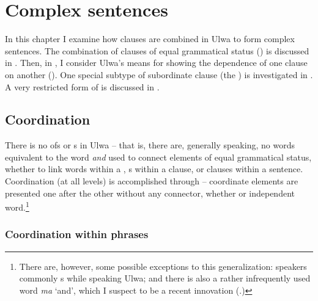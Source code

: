 \chapter{Complex sentences}\label{sec:12}


In this chapter I examine how clauses are combined in Ulwa to form complex sentences. The combination of clauses of equal grammatical status () is discussed in . Then, in , I consider Ulwa’s means for showing the dependence of one clause on another (). One special subtype of subordinate clause (the ) is investigated in . A very restricted form of  is discussed in .


\section{Coordination}\label{sec:12.1}


There is no  ofs or s in Ulwa -- that is, there are, generally speaking, no words equivalent to the  word \textit{and} used to connect elements of equal grammatical status, whether to link words within a , s within a clause, or clauses within a sentence. Coordination (at all  levels) is accomplished through  -- coordinate elements are presented one after the other without any  connector, whether  or independent word.\footnote{There are, however, some possible exceptions to this generalization: speakers commonly   s while speaking Ulwa; and there is also a rather infrequently used word \textit{ma} ‘and’, which I suspect to be a recent innovation (.)}


\subsection{Coordination within phrases}\label{sec:12.1.1}


